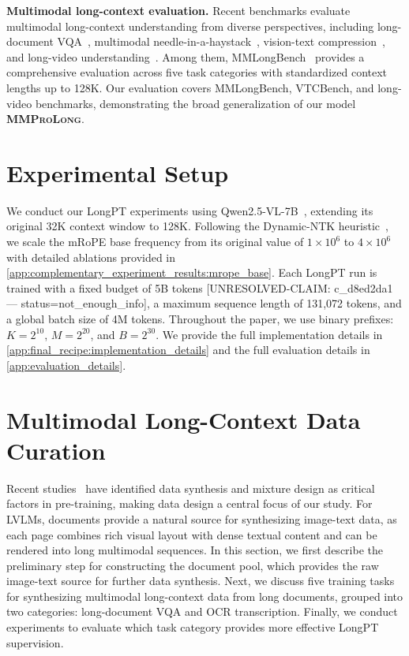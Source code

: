 \documentclass{llmxive}
\providecommand{\modelname}{\textsc{\textbf{MMProLong}}\xspace}
\begin{document}
\noindent\textbf{Multimodal long-context evaluation.}
Recent benchmarks evaluate multimodal long-context understanding from diverse perspectives, including long-document VQA~\citep{ma2024mmlongbenchdoc,deng2025longdocurl}, multimodal needle-in-a-haystack~\citep{wang2024multimodal,wu2024visual}, vision-text compression~\citep{zhao2025vtcbench}, and long-video understanding~\citep{fu2025video,zhou2025mlvu,wang2025lvbench}.
Among them, MMLongBench~\citep{wang2025mmlongbench} provides a comprehensive evaluation across five task categories with standardized context lengths up to 128K.
Our evaluation covers MMLongBench, VTCBench, and long-video benchmarks, demonstrating the broad generalization of our model \modelname.
\section{Experimental Setup}
\label{sec:setup}
We conduct our LongPT experiments using Qwen2.5-VL-7B~\citep{bai2025qwen2}, extending its original 32K context window to 128K.
Following the Dynamic-NTK heuristic~\citep{dynamicntk}, we scale the mRoPE base frequency from its original value of $1\times10^6$ to $4\times10^6$ with detailed ablations provided in \cref{app:complementary_experiment_results:mrope_base}.
Each LongPT run is trained with a fixed budget of 5B tokens [UNRESOLVED-CLAIM: c_d8ed2da1 — status=not_enough_info], a maximum sequence length of 131,072 tokens, and a global batch size of 4M tokens.
Throughout the paper, we use binary prefixes: $K=2^{10}$, $M=2^{20}$, and $B=2^{30}$.
We provide the full implementation details in \cref{app:final_recipe:implementation_details} and the full evaluation details in \cref{app:evaluation_details}.
\section{Multimodal Long-Context Data Curation}
\label{sec:curation}
Recent studies~\citep{team2025gemma3,google2026gemma4,hong2025glm} have identified data synthesis and mixture design as critical factors in pre-training, making data design a central focus of our study.
For LVLMs, documents provide a natural source for synthesizing image-text data, as each page combines rich visual layout with dense textual content and can be rendered into long multimodal sequences.
In this section, we first describe the preliminary step for constructing the document pool, which provides the raw image-text source for further data synthesis.
Next, we discuss five training tasks for synthesizing multimodal long-context data from long documents, grouped into two categories: long-document VQA and OCR transcription.
Finally, we conduct experiments to evaluate which task category provides more effective LongPT supervision.
\end{document}
